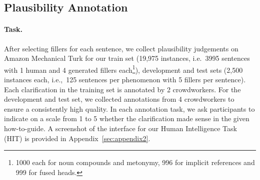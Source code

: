 \documentclass[11pt]{article}
\begin{document}
\subsection{Plausibility Annotation}
\label{subsec:step3}

\paragraph{Task.} After selecting fillers for each sentence, we collect plausibility judgements on Amazon Mechanical Turk for our train set (19,975 instances, i.e.~3995 sentences with 1 human and 4 generated fillers each\footnote{1000 each for noun compounds and metonymy, 996 for implicit references and 999 for fused heads.}), development and test sets (2,500 instances each, i.e.,~125 sentences per phenomenon with 5 fillers per sentence). %
Each clarification in the training set is annotated by 2 crowdworkers. For the development and test set, we collected annotations from 4 crowdworkers to ensure a consistently high quality.
In each annotation task, we ask participants to indicate on a scale from 1 to 5 whether the clarification made sense in the given how-to-guide. 
A screenshot of the interface for our Human Intelligence Task (HIT) is provided in Appendix~\ref{sec:appendix2}.
\end{document}
